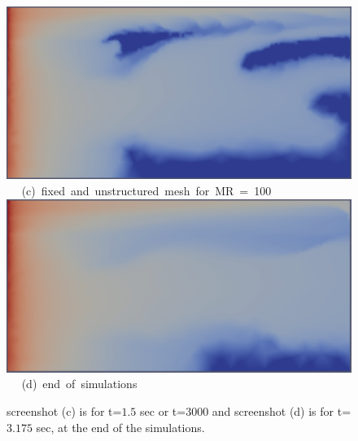 \begin{landscape}
\begin{figure}[ht] 
\vbox{
\hbox{\hspace{3.5cm}
\includegraphics[width=.8\textwidth]{./Pics1/mr100_fixed/mr100_fixed_3000.pdf} 
}
\vspace{0.0cm}
\hbox{\hspace{3.75cm} (c) fixed and unstructured mesh for MR = 100    
}
\hbox{\hspace{3.5cm}
\includegraphics[width=.8\textwidth]{./Pics1/mr100_fixed/mr100_fixed_end.pdf}
}
\vspace{0.0cm}
\hbox{\hspace{7.cm} (d) end of simulations     
}
}     
\caption{screenshot (c) is for t=$1.5$ sec or t=$3000$ and screenshot (d) is for t=$3.175$ sec, at the end of the simulations. }
\label{fig:4testcase_b}
\end{figure}
\end{landscape}
\clearpage


